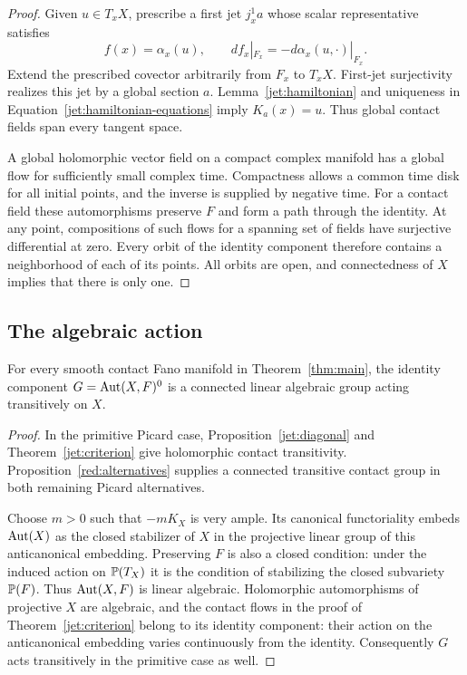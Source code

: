 \begin{proof}
Given $u\in T_xX$, prescribe a first jet $j_x^1a$ whose scalar
representative satisfies
\[
f(x)=\alpha_x(u),
\qquad df_x|_{F_x}=-d\alpha_x(u,\cdot)|_{F_x}.
\]
Extend the prescribed covector arbitrarily from $F_x$ to $T_xX$.
First-jet surjectivity realizes this jet by a global section $a$.
Lemma~\ref{jet:hamiltonian} and uniqueness in
Equation~\eqref{jet:hamiltonian-equations} imply $K_a(x)=u$.
Thus global contact fields span every tangent space.

A global holomorphic vector field on a compact complex manifold
has a global flow for sufficiently small complex time. Compactness
allows a common time disk for all initial points, and the
inverse is supplied by negative time. For a contact field these
automorphisms preserve $F$ and form a path through the identity.
At any point, compositions of such flows for a spanning set of
fields have surjective differential at zero. Every orbit of the
identity component therefore contains a neighborhood of each of
its points. All orbits are open, and connectedness of $X$ implies
that there is only one.
\end{proof}

\subsection{The algebraic action}

\begin{corollary}\label{jet:transitive}
For every smooth contact Fano manifold in Theorem~\ref{thm:main},
the identity component $G=\operatorname{Aut}(X,F)^0$ is a connected linear
algebraic group acting transitively on $X$.
\end{corollary}

\begin{proof}
In the primitive Picard case, Proposition~\ref{jet:diagonal} and
Theorem~\ref{jet:criterion} give holomorphic contact transitivity.
Proposition~\ref{red:alternatives} supplies a connected transitive
contact group in both remaining Picard alternatives.

Choose $m>0$ such that $-mK_X$ is very ample. Its canonical
functoriality embeds $\operatorname{Aut}(X)$ as the closed stabilizer of $X$ in
the projective linear group of this anticanonical embedding.
Preserving $F$ is also a closed condition: under the induced
action on $\mathbb P(T_X)$ it is the condition of stabilizing the closed
subvariety $\mathbb P(F)$. Thus $\operatorname{Aut}(X,F)$ is linear algebraic.
Holomorphic automorphisms of projective $X$ are algebraic, and
the contact flows in the proof of Theorem~\ref{jet:criterion}
belong to its identity component: their action on the
anticanonical embedding varies continuously from the identity.
Consequently $G$ acts transitively in the primitive case as well.
\end{proof}
